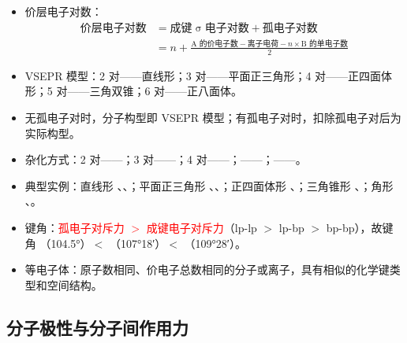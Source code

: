             \begin{itemize}
                \item 价层电子对数：
                \[
                \begin{aligned}
                    价层电子对数 &= \text{成键}\upsigma\text{电子对数} + \text{孤电子对数}\\
                                 &= n + \frac{\text{A 的价电子数} - \text{离子电荷} - n \times \text{B 的单电子数}}{2}
                \end{aligned}
                \]
                \item VSEPR 模型：2 对——直线形；3 对——平面正三角形；4 对——正四面体形；5 对——三角双锥；6 对——正八面体。
                \item 无孤电子对时，分子构型即 VSEPR 模型；有孤电子对时，扣除孤电子对后为实际构型。
                \item 杂化方式：2 对——；3 对——；4 对——；——；——。
                \item 典型实例：直线形 、、；平面正三角形 、、；正四面体形 、；三角锥形 、；角形 、。
                \item 键角：\textcolor{red}{孤电子对斥力 \(>\) 成键电子对斥力}（lp-lp \(>\) lp-bp \(>\) bp-bp），故键角 （\ang{104.5}）\(<\) （\ang{107;18}）\(<\) （\ang{109;28}）。
                \item 等电子体：原子数相同、价电子总数相同的分子或离子，具有相似的化学键类型和空间结构。
            \end{itemize}

        \subsection{分子极性与分子间作用力}

